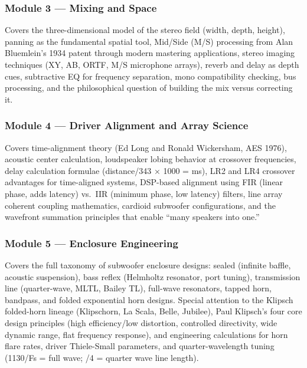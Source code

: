 \documentclass[11pt,letterpaper]{article}
\begin{document}
\subsubsection{Module 3 --- Mixing and Space}
Covers the three-dimensional model of the stereo field (width, depth, height), panning as the fundamental spatial tool, Mid/Side (M/S) processing from Alan Bluemlein's 1934 patent through modern mastering applications, stereo imaging techniques (XY, AB, ORTF, M/S microphone arrays), reverb and delay as depth cues, subtractive EQ for frequency separation, mono compatibility checking, bus processing, and the philosophical question of building the mix versus correcting it.

\subsubsection{Module 4 --- Driver Alignment and Array Science}
Covers time-alignment theory (Ed Long and Ronald Wickersham, AES 1976), acoustic center calculation, loudspeaker lobing behavior at crossover frequencies, delay calculation formulae (distance/343 × 1000 = ms), LR2 and LR4 crossover advantages for time-aligned systems, DSP-based alignment using FIR (linear phase, adds latency) vs.\ IIR (minimum phase, low latency) filters, line array coherent coupling mathematics, cardioid subwoofer configurations, and the wavefront summation principles that enable ``many speakers into one.''

\subsubsection{Module 5 --- Enclosure Engineering}
Covers the full taxonomy of subwoofer enclosure designs: sealed (infinite baffle, acoustic suspension), bass reflex (Helmholtz resonator, port tuning), transmission line (quarter-wave, MLTL, Bailey TL), full-wave resonators, tapped horn, bandpass, and folded exponential horn designs. Special attention to the Klipsch folded-horn lineage (Klipschorn, La Scala, Belle, Jubilee), Paul Klipsch's four core design principles (high efficiency/low distortion, controlled directivity, wide dynamic range, flat frequency response), and engineering calculations for horn flare rates, driver Thiele-Small parameters, and quarter-wavelength tuning (1130/Fs = full wave; /4 = quarter wave line length).
\end{document}

